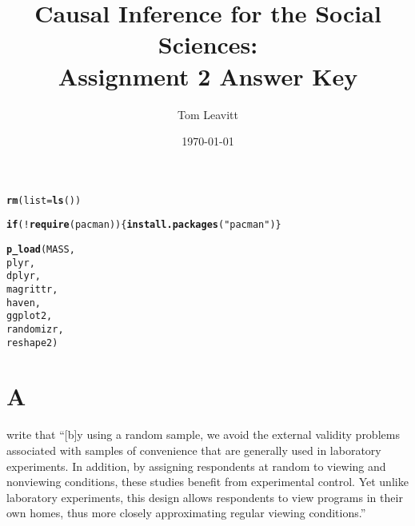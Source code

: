 \documentclass[11pt]{article}\usepackage[]{graphicx}\usepackage[]{color}
\makeatletter
\newcommand{\hlstr}[1]{\textcolor[rgb]{0.192,0.494,0.8}{#1}}%
\newcommand{\hlopt}[1]{\textcolor[rgb]{0,0,0}{#1}}%
\newcommand{\hlstd}[1]{\textcolor[rgb]{0.345,0.345,0.345}{#1}}%
\newcommand{\hlkwa}[1]{\textcolor[rgb]{0.161,0.373,0.58}{\textbf{#1}}}%
\newcommand{\hlkwc}[1]{\textcolor[rgb]{0.333,0.667,0.333}{#1}}%
\newcommand{\hlkwd}[1]{\textcolor[rgb]{0.737,0.353,0.396}{\textbf{#1}}}%
\newenvironment{kframe}{%
 \def\at@end@of@kframe{}%
 \ifinner\ifhmode%
  \def\at@end@of@kframe{\end{minipage}}%
  \begin{minipage}{\columnwidth}%
 \fi\fi%
 \def\FrameCommand##1{\hskip\@totalleftmargin \hskip-\fboxsep
 \colorbox{shadecolor}{##1}\hskip-\fboxsep
     \hskip-\linewidth \hskip-\@totalleftmargin \hskip\columnwidth}%
 \MakeFramed {\advance\hsize-\width
   \@totalleftmargin\z@ \linewidth\hsize
   \@setminipage}}%
 {\par\unskip\endMakeFramed%
 \at@end@of@kframe}
\newenvironment{knitrout}{}{} %
\theoremstyle{newstyle}
\makeatother
\begin{document}
\begin{titlepage}
\title{Causal Inference for the Social Sciences: \\
Assignment 2 Answer Key}
\author{Tom Leavitt}
\date{\today}
\maketitle

\end{titlepage}
\tableofcontents
\clearpage

\doublespacing

\maketitle

\begin{knitrout}
\color{fgcolor}\begin{kframe}
\begin{alltt}
\hlkwd{rm}\hlstd{(}\hlkwc{list}\hlstd{=}\hlkwd{ls}\hlstd{())}

\hlkwa{if}\hlstd{(}\hlopt{!}\hlkwd{require}\hlstd{(pacman)) \{} \hlkwd{install.packages}\hlstd{(}\hlstr{"pacman"}\hlstd{) \}}
\end{alltt}


{\ttfamily\noindent\itshape\color{messagecolor}{\#\# Loading required package: pacman}}\begin{alltt}
\hlkwd{p_load}\hlstd{(MASS,}
       \hlstd{plyr,}
       \hlstd{dplyr,}
       \hlstd{magrittr,}
       \hlstd{haven,}
       \hlstd{ggplot2,}
       \hlstd{randomizr,}
       \hlstd{reshape2)}
\end{alltt}
\end{kframe}
\end{knitrout}

\section{A}

\citet[276--277]{albertsonlawrence2009} write that ``[b]y using a random sample, we avoid the external validity problems associated with samples of convenience that are generally used in laboratory experiments. In addition, by assigning respondents at random to viewing and nonviewing conditions, these studies benefit from experimental control. Yet unlike laboratory experiments, this design allows respondents to view programs in their own homes, thus more closely approximating regular viewing conditions.''
\end{document}

